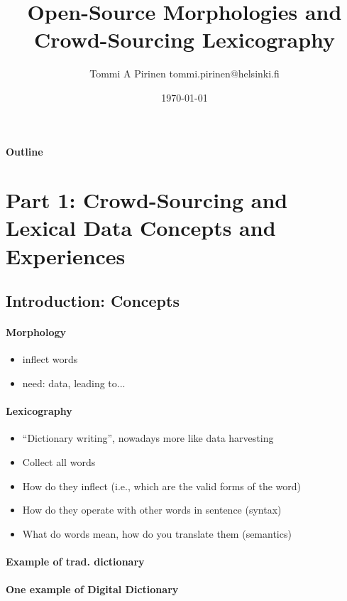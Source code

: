 \documentclass[t,12pt]{beamer}
\title{Open-Source Morphologies and Crowd-Sourcing Lexicography}
\author{Tommi A Pirinen \scriptsize \guilsinglleft{}tommi.pirinen@helsinki.fi\guilsinglright{}}
\institute{University of Helsinki\\Department of Speech Sciences}
\date{\today}
\begin{document}

\HyTitle

\begin{frame}
    \frametitle{Outline}
    \tableofcontents
\end{frame}

\chapter{Part 1: Crowd-Sourcing and Lexical Data Concepts and Experiences}

\section{Introduction: Concepts}

\begin{frame}
    \frametitle{Morphology}
    \begin{itemize}
        \item inflect words
        \item need: data, leading to...
    \end{itemize}
\end{frame}

\begin{frame}
    \frametitle{Lexicography}
    \begin{itemize}
        \item ``Dictionary writing'', nowadays more like data harvesting
        \item Collect all words
        \item How do they inflect (i.e., which are the valid forms of the word)
        \item How do they operate with other words in sentence (syntax)
        \item What do words mean, how do you translate them (semantics)
    \end{itemize}
\end{frame}

\begin{frame}
    \frametitle{Example of trad. dictionary}
\end{frame}

\begin{frame}
    \frametitle{One example of Digital Dictionary}
    \texttt{}
\end{frame}
\end{document}

